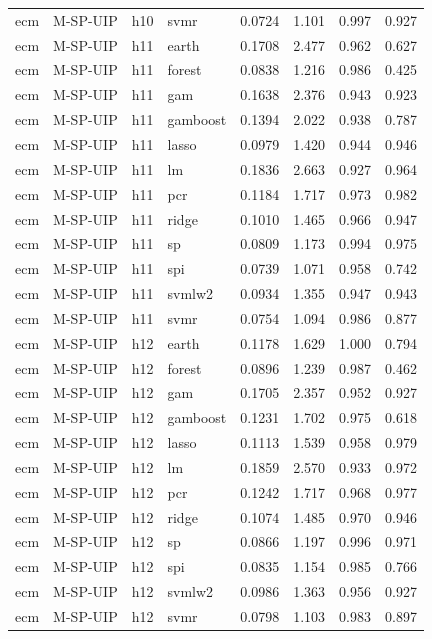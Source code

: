 \begin{ThreePartTable}
\begin{longtable}[t]{llclcccc}
ecm & M-SP-UIP & h10 & svmr & 0.0724 & 1.101 & 0.997 & 0.927\\
\addlinespace
ecm & M-SP-UIP & h11 & earth & 0.1708 & 2.477 & 0.962 & 0.627\\
ecm & M-SP-UIP & h11 & forest & 0.0838 & 1.216 & 0.986 & 0.425\\
ecm & M-SP-UIP & h11 & gam & 0.1638 & 2.376 & 0.943 & 0.923\\
ecm & M-SP-UIP & h11 & gamboost & 0.1394 & 2.022 & 0.938 & 0.787\\
ecm & M-SP-UIP & h11 & lasso & 0.0979 & 1.420 & 0.944 & 0.946\\
ecm & M-SP-UIP & h11 & lm & 0.1836 & 2.663 & 0.927 & 0.964\\
ecm & M-SP-UIP & h11 & pcr & 0.1184 & 1.717 & 0.973 & 0.982\\
ecm & M-SP-UIP & h11 & ridge & 0.1010 & 1.465 & 0.966 & 0.947\\
ecm & M-SP-UIP & h11 & sp & 0.0809 & 1.173 & 0.994 & 0.975\\
ecm & M-SP-UIP & h11 & spi & 0.0739 & 1.071 & 0.958 & 0.742\\
ecm & M-SP-UIP & h11 & svmlw2 & 0.0934 & 1.355 & 0.947 & 0.943\\
ecm & M-SP-UIP & h11 & svmr & 0.0754 & 1.094 & 0.986 & 0.877\\
\addlinespace
ecm & M-SP-UIP & h12 & earth & 0.1178 & 1.629 & 1.000 & 0.794\\
ecm & M-SP-UIP & h12 & forest & 0.0896 & 1.239 & 0.987 & 0.462\\
ecm & M-SP-UIP & h12 & gam & 0.1705 & 2.357 & 0.952 & 0.927\\
ecm & M-SP-UIP & h12 & gamboost & 0.1231 & 1.702 & 0.975 & 0.618\\
ecm & M-SP-UIP & h12 & lasso & 0.1113 & 1.539 & 0.958 & 0.979\\
ecm & M-SP-UIP & h12 & lm & 0.1859 & 2.570 & 0.933 & 0.972\\
ecm & M-SP-UIP & h12 & pcr & 0.1242 & 1.717 & 0.968 & 0.977\\
ecm & M-SP-UIP & h12 & ridge & 0.1074 & 1.485 & 0.970 & 0.946\\
ecm & M-SP-UIP & h12 & sp & 0.0866 & 1.197 & 0.996 & 0.971\\
ecm & M-SP-UIP & h12 & spi & 0.0835 & 1.154 & 0.985 & 0.766\\
ecm & M-SP-UIP & h12 & svmlw2 & 0.0986 & 1.363 & 0.956 & 0.927\\
ecm & M-SP-UIP & h12 & svmr & 0.0798 & 1.103 & 0.983 & 0.897\\

\end{longtable}
\end{ThreePartTable}
